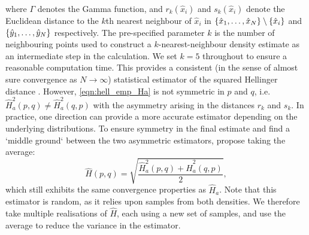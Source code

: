 where \(\Gamma\) denotes the Gamma function, and \(r_k\!\left(\hat{x}_i\right)\) and \(s_k\!\left(\hat{x}_i\right)\) denote the Euclidean distance to the \(k\)th nearest neighbour of \(\hat{x}_i\) in \(\set{\hat{x}_1, \dotsc, \hat{x}_N} \setminus \set{\hat{x}_i}\) and \(\set{\hat{y}_1, \dotsc, \hat{y}_N}\) respectively.
The pre-specified parameter \(k\) is the number of neighbouring points used to construct a \(k\)-nearest-neighbour density estimate as an intermediate step in the calculation.
We set \(k = 5\) throughout to ensure a reasonable computation time.
This provides a consistent (in the sense of almost sure convergence as \(N \to \infty\)) statistical estimator of the squared Hellinger distance \citep{DingMullhaupt_2023_EmpiricalSquaredHellinger}.
However, \cref{eqn:hell_emp_Ha} is not symmetric in \(p\) and \(q\), i.e.\ \(\hat{H}_a^2\!\left(p,q\right) \neq \hat{H}_a^2\!\left(q,p\right)\) with the asymmetry arising in the distances \(r_k\) and \(s_k\).
In practice, one direction can provide a more accurate estimator depending on the underlying distributions.
To ensure symmetry in the final estimate and find a `middle ground` between the two asymmetric estimators, \citet{DingMullhaupt_2023_EmpiricalSquaredHellinger} propose taking the average:
\begin{equation}\label{eqn:hell_emp}
	\hat{H}\!\left(p,q\right) = \sqrt{\frac{\hat{H}_a^2\!\left(p,q\right) + \hat{H}_a^2\!\left(q,p\right)}{2}},
\end{equation}
which still exhibits the same convergence properties as \(\hat{H}_a\).
Note that this estimator is random, as it relies upon samples from both densities.
We therefore take multiple realisations of \(\hat{H}\), each using a new set of samples, and use the average to reduce the variance in the estimator.


